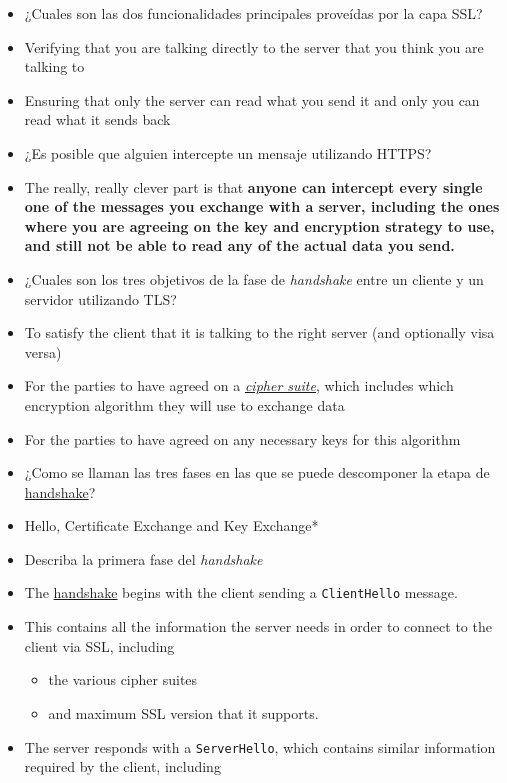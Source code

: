 \begin{itemize}
\itemsep1pt\parskip0pt
\item
  ¿Cuales son las dos funcionalidades principales proveídas por la capa
  SSL?
\item
  Verifying that you are talking directly to the server that you think
  you are talking to
\item
  Ensuring that only the server can read what you send it and only you
  can read what it sends back
\item
  ¿Es posible que alguien intercepte un mensaje utilizando HTTPS?
\item
  The really, really clever part is that \textbf{anyone can intercept
  every single one of the messages you exchange with a server, including
  the ones where you are agreeing on the key and encryption strategy to
  use, and still not be able to read any of the actual data you send.}
\item
  ¿Cuales son los tres objetivos de la fase de \emph{handshake} entre un
  cliente y un servidor utilizando TLS?
\item
  To satisfy the client that it is talking to the right server (and
  optionally visa versa)
\item
  For the parties to have agreed on a
  \emph{\href{https://en.wikipedia.org/wiki/Cipher_suite}{cipher
  suite}}, which includes which encryption algorithm they will use to
  exchange data
\item
  For the parties to have agreed on any necessary keys for this
  algorithm
\item
  ¿Como se llaman las tres fases en las que se puede descomponer la
  etapa de \href{http://www.dictionary.com/browse/handshake}{handshake}?
\item
  Hello, Certificate Exchange and Key Exchange*
\item
  Describa la primera fase del \emph{handshake}
\item
  The \href{http://www.dictionary.com/browse/handshake}{handshake}
  begins with the client sending a \texttt{ClientHello} message.
\item
  This contains all the information the server needs in order to connect
  to the client via SSL, including

  \begin{itemize}
  \itemsep1pt\parskip0pt
  \item
    the various cipher suites
  \item
    and maximum SSL version that it supports.
  \end{itemize}
\item
  The server responds with a \texttt{ServerHello}, which contains
  similar information required by the client, including


\end{itemize}
